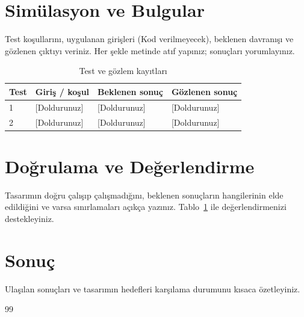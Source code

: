 \documentclass[12pt,a4paper]{article}
\begin{document}
\section{Simülasyon ve Bulgular}
Test koşullarını, uygulanan girişleri (Kod verilmeyecek), beklenen davranışı ve gözlenen çıktıyı veriniz. Her şekle metinde atıf yapınız; sonuçları yorumlayınız.
\begin{table}[htbp]\centering
\caption{Test ve gözlem kayıtları}\label{tab:test}
\begin{tabularx}{\linewidth}{@{}lXXX@{}}\toprule
Test & Giriş / koşul & Beklenen sonuç & Gözlenen sonuç \\ \midrule
1 & [Doldurunuz] & [Doldurunuz] & [Doldurunuz] \\
2 & [Doldurunuz] & [Doldurunuz] & [Doldurunuz] \\ \bottomrule
\end{tabularx}
\end{table}


\section{Doğrulama ve Değerlendirme}
Tasarımın doğru çalışıp çalışmadığını, beklenen sonuçların hangilerinin elde edildiğini ve varsa sınırlamaları açıkça yazınız. Tablo~\ref{tab:test} ile değerlendirmenizi destekleyiniz.

\section{Sonuç}
Ulaşılan sonuçları ve tasarımın hedefleri karşılama durumunu kısaca özetleyiniz.

\begin{thebibliography}{99}
\end{thebibliography}
\end{document}

